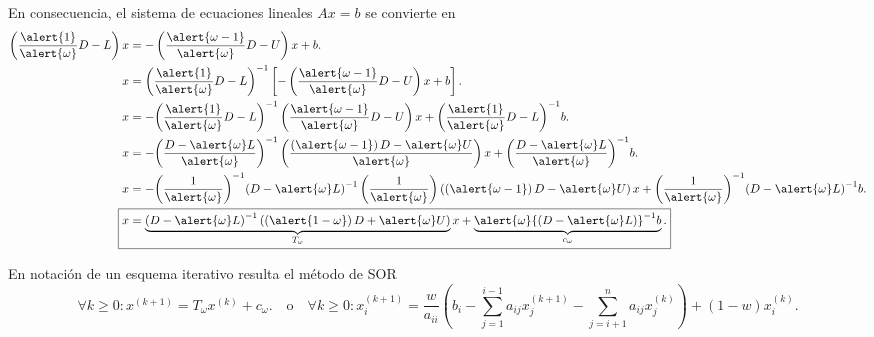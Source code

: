 \begin{frame}
	En consecuencia, el sistema de ecuaciones lineales $Ax=b$ se convierte en
	\begin{align*}
		\left(\frac{\alert{1}}{\alert{\omega}}D-L\right)x
		 & = -\left(\frac{\alert{\omega-1}}{\alert{\omega}}D-U\right)x + b. \\
		x
		 & ={\left(\frac{\alert{1}}{\alert{\omega}}D-L\right)}^{-1}
		\left[
			-\left(\frac{\alert{\omega-1}}{\alert{\omega}}D-U\right)x+
			b
		\right].                                                            \\
		x
		 & =
		-{\left(\frac{\alert{1}}{\alert{\omega}}D-L\right)}^{-1}
		\left(\frac{\alert{\omega-1}}{\alert{\omega}}D-U\right)x+
		{\left(\frac{\alert{1}}{\alert{\omega}}D-L\right)}^{-1}
		b.                                                                  \\
		x
		 & =
		-{\left(\frac{D-\alert{\omega}L}{\alert{\omega}}\right)}^{-1}
		\left(\frac{\left(\alert{\omega-1}\right)D-\alert{\omega}U}{\alert{\omega}}\right)x+
		{\left(\frac{D-\alert{\omega}L}{\alert{\omega}}\right)}^{-1}
		b.                                                                  \\
		x
		 & =
		-{\left(\frac{1}{\alert{\omega}}\right)}^{-1}{\left(D-\alert{\omega}L\right)}^{-1}
		\left(\frac{1}{\alert{\omega}}\right)\left(\left(\alert{\omega-1}\right)D-\alert{\omega}U\right)x+
		{\left(\frac{1}{\alert{\omega}}\right)}^{-1}{\left(D-\alert{\omega}L\right)}^{-1}
		b.                                                                  \\
		\Aboxed{
		x
		 & =
		\underbrace{
			{\left(D-\alert{\omega}L\right)}^{-1}
			\left(\left(\alert{1-\omega}\right)D+\alert{\omega}U\right)
		}_{T_{\omega}}x+
		\underbrace{
			\alert{\omega}{\left(D-\alert{\omega}L\right)}^{-1}b
		}_{c_{\omega}}.
		}
	\end{align*}

	En notación de un esquema iterativo resulta el \alert{método de SOR}
	\begin{equation*}
		\boxed{
		\forall k\geq0\colon
		x^{\left(k+1\right)}=
		T_{\omega}x^{\left(k\right)}+
		c_{\omega}.
		}\quad\text{o}\quad
		\boxed{
		\forall k\geq0\colon
		x_{i}^{\left(k+1\right)}=
		\frac{w}{a_{ii}}
		\left(
		b_{i}-
		\sum_{j=1}^{i-1}a_{ij}x_j^{\left(k+1\right)}-
		\sum_{j=i+1}^{n}a_{ij}x_{j}^{\left(k\right)}\right)+
		\left(1-w\right)x_{i}^{\left(k\right)}.
		}
	\end{equation*}
\end{frame}

